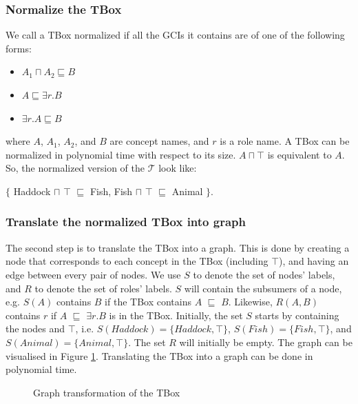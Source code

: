 \subsubsection{Normalize the TBox}
We call a TBox normalized if all the GCIs it contains are of one of the following forms:
\begin{itemize}
\item $A_1 \sqcap A_2 \sqsubseteq B$
\item $A \sqsubseteq \exists r.B$
\item $\exists r.A \sqsubseteq B$
\end{itemize}
where $A$, $A_1$, $A_2$, and $B$ are concept names, and $r$ is a role name. A TBox can be normalized in polynomial time with respect to its size. $A \sqcap \top$ is equivalent to $A$. So, the normalized version of the $\mathcal{T}$ look like:
\begin{center}
$\lbrace$ Haddock $\sqcap$ $\top$ $\sqsubseteq$ Fish, Fish $\sqcap$ $\top$ $\sqsubseteq$ Animal $\rbrace$.
\end{center}

\subsubsection{Translate the normalized TBox into graph}
The second step is to translate the TBox into a graph. This is done by creating a node that corresponds to each concept in the TBox (including $\top$), and having an edge between every pair of nodes. We use $S$ to denote the set of nodes' labels, and $R$ to denote the set of roles' labels. $S$ will contain the subsumers of a node, e.g. $S(A)$ contains $B$ if the TBox contains $A$ $\sqsubseteq$ $B$. Likewise, $R(A, B)$ contains $r$ if $A$ $\sqsubseteq$ $\exists r.B$ is in the TBox. Initially, the set $S$ starts by containing the nodes and $\top$, i.e. $S(Haddock)= \lbrace Haddock, \top \rbrace$, $S(Fish) = \lbrace Fish, \top \rbrace$, and $S(Animal)= \lbrace Animal , \top \rbrace$. The set $R$ will initially be empty. The graph can be visualised in Figure \ref{hdk}. Translating the TBox into a graph can be done in polynomial time.

\begin{figure}
\centering
{}
\caption{Graph transformation of the TBox}
\label{hdk}
\end{figure}

